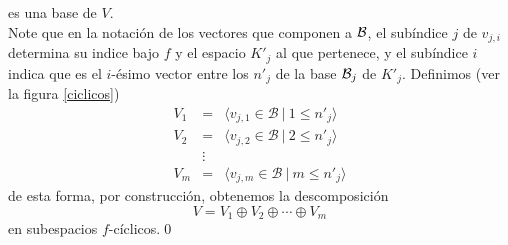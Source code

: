 es una base de $V$.\\
Note que en la notación de los vectores que componen a $\mathcal{B}$, el subíndice $j$ de $v_{j,i}$ determina su indice bajo $f$ y el espacio $K'_j$ al que pertenece, y el subíndice $i$ indica que es el $i$-ésimo vector entre los $n'_j$ de la base $\mathcal{B}_j$ de $K'_j$. Definimos (ver la figura \ref{ciclicos})
\begin{eqnarray*}
V_1 & = & \langle v_{j,1}\in \mathcal{B}\ |\ 1\le n'_j\rangle \\
V_2 & = & \langle v_{j,2}\in \mathcal{B}\ |\ 2\le n'_j\rangle \\
       & \vdots & \\
V_m & = & \langle v_{j,m}\in \mathcal{B}\ |\ m\le n'_j\rangle
\end{eqnarray*}
de esta forma, por construcci\'on, obtenemos la descomposición
$$V=V_1\oplus V_2\oplus \cdots\oplus V_m$$
en subespacios $f$-c\'iclicos.\qed 


